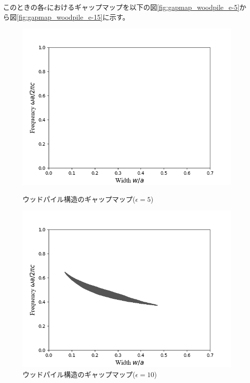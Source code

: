 \documentclass[platex,dvipdfmx]{jsreport}
\numberwithin{equation}{section}
\begin{document}
このときの各$\epsilon$におけるギャップマップを以下の図\ref{fig:gapmap_woodpile_e-5}から図\ref{fig:gapmap_woodpile_e-15}に示す。
\begin{figure}[h]
  \begin{minipage}[h]{0.5\linewidth}
    \centering
    \includegraphics[keepaspectratio, scale=0.45]{results/gap_map/woodpile-2_e-5.png}
    \caption{ウッドパイル構造のギャップマップ($\epsilon = 5$)}
    \label{fig:gapmap_woodpile_e-5}
  \end{minipage}
  \begin{minipage}[h]{0.5\linewidth}
    \centering
    \includegraphics[keepaspectratio, scale=0.45]{results/gap_map/woodpile-2_e-10.png}
    \caption{ウッドパイル構造のギャップマップ($\epsilon = 10$)}
    \label{fig:gapmap_woodpile_e-10}
  \end{minipage}
\end{figure}
\end{document}
